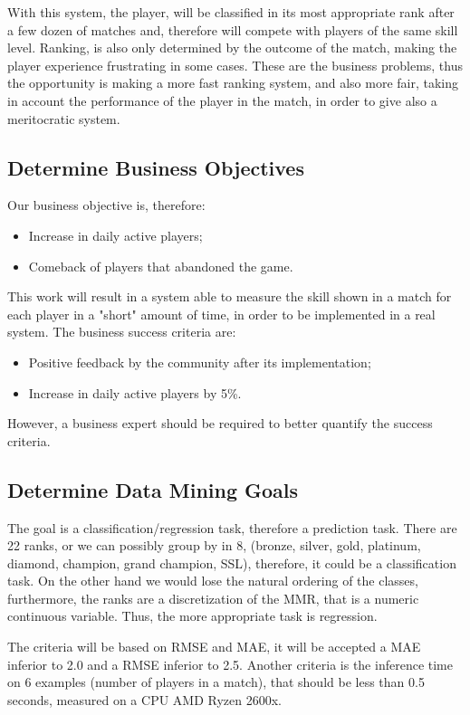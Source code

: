With this system, the player, will be classified in its most appropriate rank after a few dozen of matches and, therefore will compete with players of the same skill level.
Ranking, is also only determined by the outcome of the match, making the player experience frustrating in some cases. These are the business problems, thus the opportunity is making a more fast ranking system, and also more fair, taking in account the performance of the player in the match, in order to give also a meritocratic system.

\subsection{Determine Business Objectives}

Our business objective is, therefore:
\begin{itemize}
    \item Increase in daily active players;
    \item Comeback of players that abandoned the game.
\end{itemize}


This work will result in a system able to measure the skill shown in a match for each player in a "short" amount of time, in order to be implemented in a real system.
The business success criteria are:
\begin{itemize}
    \item Positive feedback by the community after its implementation;
    \item Increase in daily active players by 5\%.
\end{itemize}

However, a business expert should be required to better quantify the success criteria.

\subsection{Determine Data Mining Goals}
\label{sec:min_goal}
The goal is a classification/regression task, therefore a prediction task. There are 22 ranks, or we can possibly group by in 8, (bronze, silver, gold, platinum, diamond, champion, grand champion, SSL), therefore, it could be a classification task. On the other hand we would lose the natural ordering of the classes, furthermore, the ranks are a discretization of the MMR, that is a numeric continuous variable. Thus, the more appropriate task is regression.

The criteria will be based on RMSE and MAE, it will be accepted a MAE inferior to 2.0 and a RMSE inferior to 2.5. 
Another criteria is the inference time on 6 examples (number of players in a match), that should be less than 0.5 seconds, measured on a CPU AMD Ryzen 2600x.
